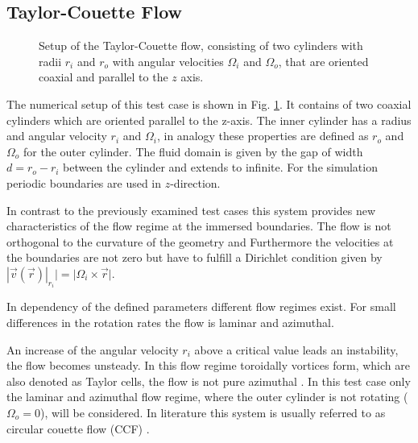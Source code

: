 \subsection{Taylor-Couette Flow}

\begin{figure}[!bp]
  \begin{minipage}[c]{0.6\textwidth}
      \centering
  \end{minipage}
  \begin{minipage}[c]{0.3\textwidth}
      \caption{Setup of the Taylor-Couette flow, consisting of  two cylinders with radii $r_i$ and $r_o$ with angular velocities $\Omega_i$ and $\Omega_o$, that are oriented coaxial
       and parallel to the $z$ axis.
      \label{validation:setup_tcflow}
      }
  \end{minipage}
\end{figure}

The numerical setup of this test case is shown in Fig. \ref{validation:setup_tcflow}.
It contains of two coaxial cylinders which are oriented parallel to the z-axis.
The inner cylinder has a radius and angular velocity $r_i$ and $\Omega_i$, in analogy these properties are defined as
$r_o$ and $\Omega_o$ for the outer cylinder.
The fluid domain is given by the gap of width $d = r_o - r_i$ between the cylinder and extends to infinite.
For the simulation  periodic boundaries are used in $z$-direction.

In contrast to the previously examined test cases this system provides new characteristics
of the flow regime at the immersed boundaries. The flow is not orthogonal to the curvature of the geometry and
Furthermore the velocities at the boundaries are not zero but have to fulfill  a Dirichlet condition given by
$|\vec{v}(\vec{r})|_{r_i} | = |\Omega_i \times \vec{r}|$.

In dependency of the defined parameters different flow regimes exist.
For small differences in the rotation rates the flow is laminar and azimuthal.

An increase of the angular velocity $r_i$ above a critical value leads an instability, the flow becomes unsteady.
In this flow regime toroidally vortices form, which are also denoted as Taylor cells,
the flow is not pure azimuthal \citep{tritton88}.
In this test case only the laminar and azimuthal flow regime, where the outer cylinder is not rotating ($\Omega_o = 0$), will be considered.
In literature this system is usually referred to as circular couette flow (CCF) \citep{Kundu2012}.

